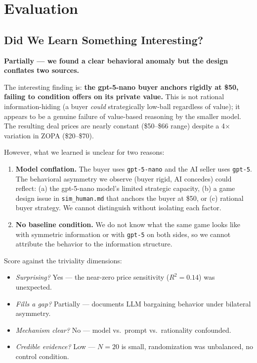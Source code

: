 \documentclass[11pt]{article}
\begin{document}
\section*{Evaluation}

\subsection*{Did We Learn Something Interesting?}

\textbf{Partially --- we found a clear behavioral anomaly but the design conflates two sources.}

The interesting finding is: \textbf{the gpt-5-nano buyer anchors rigidly at \$50, failing to condition offers on its private value.} This is not rational information-hiding (a buyer \emph{could} strategically low-ball regardless of value); it appears to be a genuine failure of value-based reasoning by the smaller model. The resulting deal prices are nearly constant (\$50--\$66 range) despite a 4$\times$ variation in ZOPA (\$20--\$70).

However, what we learned is unclear for two reasons:

\begin{enumerate}
\item \textbf{Model conflation.} The buyer uses \texttt{gpt-5-nano} and the AI seller uses \texttt{gpt-5}. The behavioral asymmetry we observe (buyer rigid, AI concedes) could reflect: (a) the gpt-5-nano model's limited strategic capacity, (b) a game design issue in \texttt{sim\_human.md} that anchors the buyer at \$50, or (c) rational buyer strategy. We cannot distinguish without isolating each factor.

\item \textbf{No baseline condition.} We do not know what the same game looks like with symmetric information or with \texttt{gpt-5} on both sides, so we cannot attribute the behavior to the information structure.
\end{enumerate}

Score against the triviality dimensions:
\begin{itemize}
    \item \textit{Surprising?} Yes --- the near-zero price sensitivity ($R^2 = 0.14$) was unexpected.
    \item \textit{Fills a gap?} Partially --- documents LLM bargaining behavior under bilateral asymmetry.
    \item \textit{Mechanism clear?} No --- model vs.\ prompt vs.\ rationality confounded.
    \item \textit{Credible evidence?} Low --- $N = 20$ is small, randomization was unbalanced, no control condition.
\end{itemize}
\end{document}
